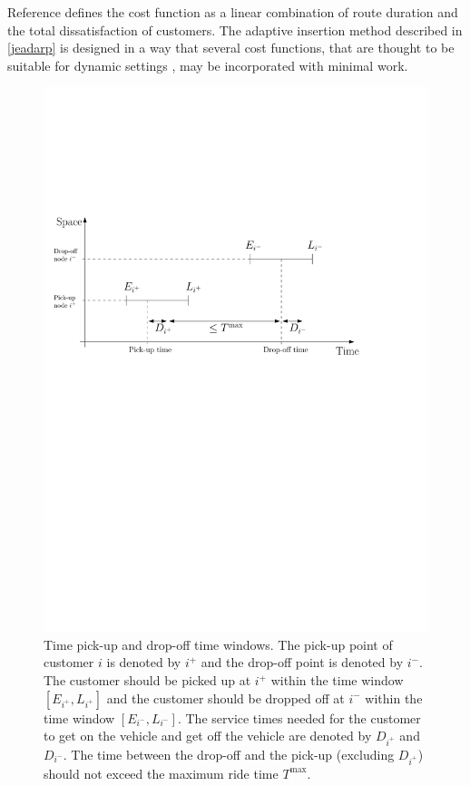\documentclass[dissertation,draft*]{aaltoseries}
\begin{document}
Reference \cite{psaraftis01} defines the cost function as a linear combination of route duration and the 
total dissatisfaction of customers. The adaptive insertion method described in \ref{jeadarp} is designed in a way 
that several cost functions, that are thought to be suitable for dynamic settings \cite{Hyytia2010}, may be incorporated with minimal work.

\begin{figure}[ht]
\begin{center}
\includegraphics[width=0.8 \columnwidth]{timeline01}
\caption{Time pick-up and drop-off time windows. The pick-up point of
customer $i$ is denoted by $i^{+}$ and the drop-off point is denoted by $i^{-}$.
The customer should be picked up at $i^{+}$ within the time window $[E_{i^+},L_{i^+}]$
and the customer should be dropped off at $i^{-}$ within the time window $[E_{i^{-}},L_{i^{-}}]$.
The service times needed for the customer to get on the vehicle
and get off the vehicle are denoted by $D_{i^+}$ and $D_{i^-}$. The time between
the drop-off and the pick-up (excluding $D_{i^+}$) should not exceed the maximum ride time $T^{\max}$.
}
\label{timeline01}
\end{center}
\end{figure}
\end{document}
